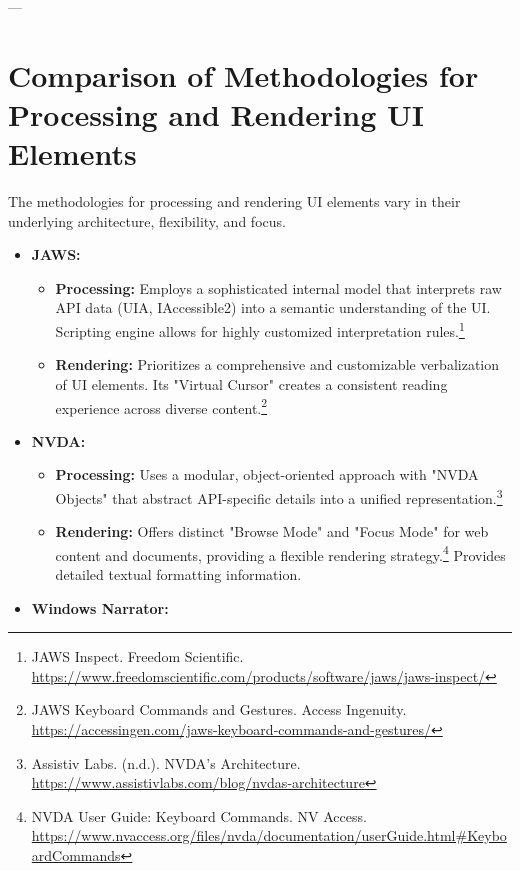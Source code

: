 ---

\section{Comparison of Methodologies for Processing and Rendering UI Elements}

The methodologies for processing and rendering UI elements vary in their underlying architecture, flexibility, and focus.

\begin{itemize}[leftmargin=*,noitemsep,topsep=0pt]
    \item \textbf{JAWS:}
    \begin{itemize}[leftmargin=*,noitemsep,topsep=0pt]
        \item \textbf{Processing:} Employs a sophisticated internal model that interprets raw API data (UIA, IAccessible2) into a semantic understanding of the UI. Scripting engine allows for highly customized interpretation rules.\footnote{JAWS Inspect. Freedom Scientific. \url{https://www.freedomscientific.com/products/software/jaws/jaws-inspect/}}
        \item \textbf{Rendering:} Prioritizes a comprehensive and customizable verbalization of UI elements. Its "Virtual Cursor" creates a consistent reading experience across diverse content.\footnote{JAWS Keyboard Commands and Gestures. Access Ingenuity. \url{https://accessingen.com/jaws-keyboard-commands-and-gestures/}}
    \end{itemize}
    \item \textbf{NVDA:}
    \begin{itemize}[leftmargin=*,noitemsep,topsep=0pt]
        \item \textbf{Processing:} Uses a modular, object-oriented approach with "NVDA Objects" that abstract API-specific details into a unified representation.\footnote{Assistiv Labs. (n.d.). NVDA's Architecture. \url{https://www.assistivlabs.com/blog/nvdas-architecture}}
        \item \textbf{Rendering:} Offers distinct "Browse Mode" and "Focus Mode" for web content and documents, providing a flexible rendering strategy.\footnote{NVDA User Guide: Keyboard Commands. NV Access. \url{https://www.nvaccess.org/files/nvda/documentation/userGuide.html#KeyboardCommands}} Provides detailed textual formatting information.
    \end{itemize}
    \item \textbf{Windows Narrator:}
    \begin{itemize}[leftmargin=*,noitemsep,topsep=0pt]

\end{itemize}
\end{itemize}
